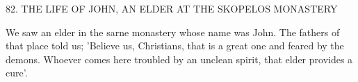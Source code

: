 82. THE LIFE OF JOHN,
AN ELDER AT THE SKOPELOS MONASTERY

We saw an elder in the sarne monastery whose name was John. The
fathers of that place told us; 'Believe us, Christians, that is a great
one and feared by the demons. Whoever comes here troubled by an
unclean spirit, that elder provides a cure'.


